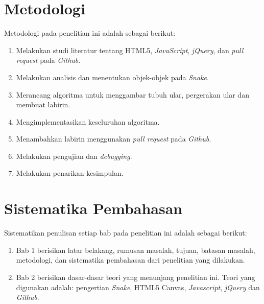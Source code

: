 \section{Metodologi}
\label{sec:metlit}
Metodologi pada penelitian ini adalah sebagai berikut:
\begin{enumerate}
	\item Melakukan studi literatur tentang HTML5, \textit{JavaScript}, \textit{jQuery}, dan \textit{pull request} pada \textit{Github}.
	\item Melakukan analisis dan menentukan objek-objek pada \textit{Snake}.
	\item Merancang algoritma untuk menggambar tubuh ular, pergerakan ular dan membuat labirin.
	\item Mengimplementasikan keseluruhan algoritma.
	\item Menambahkan labirin menggunakan \textit{pull request} pada \textit{Github}.
	\item Melakukan pengujian dan \textit{debugging}.
	\item Melakukan penarikan kesimpulan. 
\end{enumerate}

\section{Sistematika Pembahasan}
\label{sec:sispem}
Sistematikan penulisan setiap bab pada penelitian ini adalah sebagai berikut:
\begin{enumerate}
	\item Bab 1 berisikan latar belakang, rumusan masalah, tujuan, batasan masalah, metodologi, dan sistematika pembahasan dari penelitian yang dilakukan.
	\item Bab 2 berisikan dasar-dasar teori yang menunjang penelitian ini. Teori yang digunakan adalah: pengertian \textit{Snake}, HTML5 Canvas, \textit{Javascript}, \textit{jQuery} dan \textit{Github}.
\end{enumerate}

